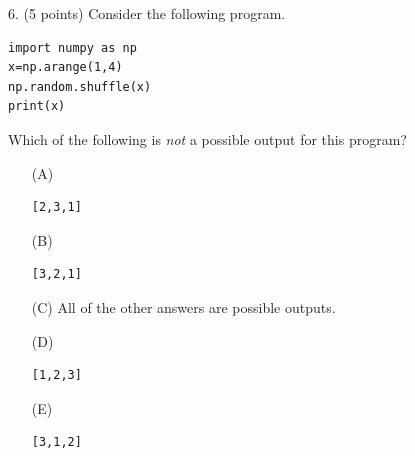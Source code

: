 \documentclass{article}
\begin{document}
\noindent
\begin{minipage}{\textwidth}
6. (5 points)
Consider the following program.
\begin{verbatim}
import numpy as np
x=np.arange(1,4)
np.random.shuffle(x)
print(x)
\end{verbatim}
Which of the following is \emph{not} a possible output for this program?

\begin{enumerate}
\item[(A)]
\begin{verbatim}[2,3,1]\end{verbatim}

\item[(B)]
\begin{verbatim}[3,2,1]\end{verbatim}

\item[(C)]
All of the other answers are possible outputs.

\item[(D)]
\begin{verbatim}[1,2,3]\end{verbatim}

\item[(E)]
\begin{verbatim}[3,1,2]\end{verbatim}

\end{enumerate}
\end{minipage}
\vspace{10em}
\filbreak\vfil{}\vfilneg
\end{document}
